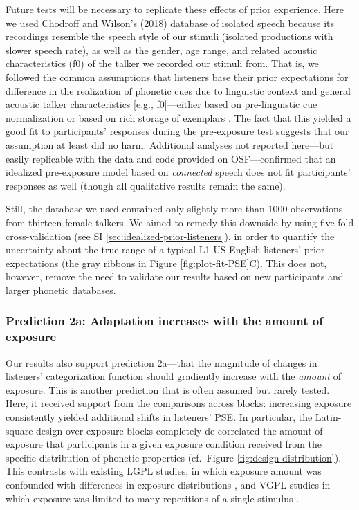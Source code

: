 \documentclass[
  11pt,
  man,mask,floatsintext]{apa6}
\begin{document}
Future tests will be necessary to replicate these effects of prior experience. Here we used Chodroff and Wilson's (2018) database of isolated speech because its recordings resemble the speech style of our stimuli (isolated productions with slower speech rate), as well as the gender, age range, and related acoustic characteristics (f0) of the talker we recorded our stimuli from. That is, we followed the common assumptions that listeners base their prior expectations for difference in the realization of phonetic cues due to linguistic context \autocites[e.g., speech rate, in line with][]{allen-miller1999,miller-dexter1988,utman1998} and general acoustic talker characteristics {[}e.g., f0{]}---either based on pre-linguistic cue normalization or based on rich storage of exemplars \autocites[for relevant discussion, see][]{apfelbaum-mcmurray2015,baese-berk2014,dilley-pitt2010,johnson1997,johnson-sjerps2021,toscano-mcmurray2012}. The fact that this yielded a good fit to participants' responses during the pre-exposure test suggests that our assumption at least did no harm. Additional analyses not reported here---but easily replicable with the data and code provided on OSF---confirmed that an idealized pre-exposure model based on \emph{connected} speech does not fit participants' responses as well (though all qualitative results remain the same).

Still, the database we used contained only slightly more than 1000 observations from thirteen female talkers. We aimed to remedy this downside by using five-fold cross-validation (see SI \ref{sec:idealized-prior-listeners}), in order to quantify the uncertainty about the true range of a typical L1-US English listeners' prior expectations (the gray ribbons in Figure \ref{fig:plot-fit-PSE}C). This does not, however, remove the need to validate our results based on new participants and larger phonetic databases.

\subsubsection{Prediction 2a: Adaptation increases with the amount of exposure}\label{prediction-2a-adaptation-increases-with-the-amount-of-exposure}

Our results also support prediction 2a---that the magnitude of changes in listeners' categorization function should gradiently increase with the \emph{amount} of exposure. This is another prediction that is often assumed but rarely tested. Here, it received support from the comparisons across blocks: increasing exposure consistently yielded additional shifts in listeners' PSE. In particular, the Latin-square design over exposure blocks completely de-correlated the amount of exposure that participants in a given exposure condition received from the specific distribution of phonetic properties (cf.~Figure \ref{fig:design-distribution}). This contrasts with existing LGPL studies, in which exposure amount was confounded with differences in exposure distributions \autocite{cummings-theodore2023,liu-jaeger2018,liu-jaeger2019}, and VGPL studies in which exposure was limited to many repetitions of a single stimulus \autocites[e.g.,][]{kleinschmidt-jaeger2012,vroomen2007}.
\end{document}
